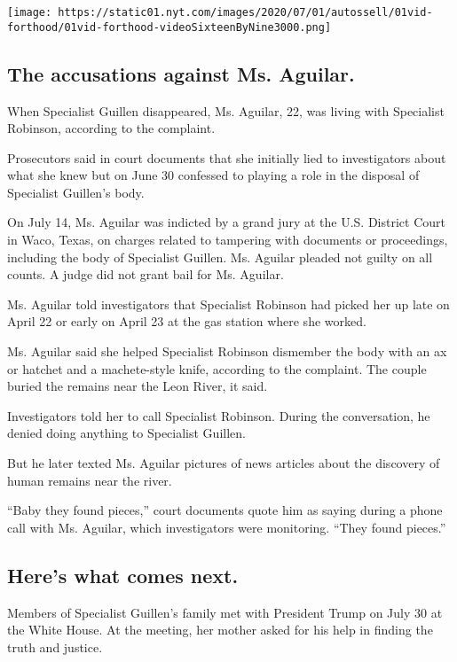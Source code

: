 \texttt{[image: https://static01.nyt.com/images/2020/07/01/autossell/01vid-forthood/01vid-forthood-videoSixteenByNine3000.png]}

\hypertarget{the-accusations-against-ms-aguilar}{%
\subsection{The accusations against Ms.
Aguilar.}\label{the-accusations-against-ms-aguilar}}

When Specialist Guillen disappeared, Ms. Aguilar, 22, was living with
Specialist Robinson, according to the complaint.

Prosecutors said in court documents that she initially lied to
investigators about what she knew but on June 30 confessed to playing a
role in the disposal of Specialist Guillen's body.

On July 14, Ms. Aguilar was indicted by a grand jury at the U.S.
District Court in Waco, Texas, on charges related to tampering with
documents or proceedings, including the body of Specialist Guillen. Ms.
Aguilar pleaded not guilty on all counts. A judge did not grant bail for
Ms. Aguilar.

Ms. Aguilar told investigators that Specialist Robinson had picked her
up late on April 22 or early on April 23 at the gas station where she
worked.

Ms. Aguilar said she helped Specialist Robinson dismember the body with
an ax or hatchet and a machete-style knife, according to the complaint.
The couple buried the remains near the Leon River, it said.

Investigators told her to call Specialist Robinson. During the
conversation, he denied doing anything to Specialist Guillen.

But he later texted Ms. Aguilar pictures of news articles about the
discovery of human remains near the river.

``Baby they found pieces,'' court documents quote him as saying during a
phone call with Ms. Aguilar, which investigators were monitoring. ``They
found pieces.''

\hypertarget{heres-what-comes-next}{%
\subsection{Here's what comes next.}\label{heres-what-comes-next}}

Members of Specialist Guillen's family met with President Trump on July
30 at the White House. At the meeting, her mother asked for his help in
finding the truth and justice.

